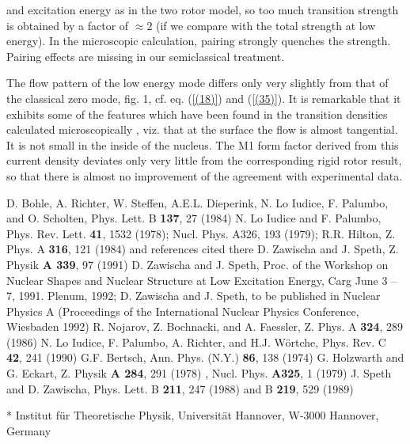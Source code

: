 \documentclass[fleqn,twocolumn,a4paper]{ikpar}
\begin{document}
and excitation energy as in the two rotor model, so
too much transition
strength is obtained by a factor of $\approx 2$ (if we compare with
the total strength at low energy). In the microscopic calculation,
pairing strongly quenches the strength.
Pairing effects are missing in
our semiclassical treatment.
\par
The flow pattern of the low energy
mode differs only very slightly from
that of the classical zero mode, fig. 1, cf. eq. (\ref{(18)}) and (\ref{(35)}).
It is remarkable that it exhibits some of the features
which have been found in the transition densities calculated
microscopically \cite{r14,r13},
viz. that at the surface the flow is almost tangential.
It is not small in the inside of the nucleus.
The M1 form factor derived
from this current density deviates only
very little from the corresponding rigid rotor result, so that
there is almost no improvement of the agreement with experimental
data.
\par
\par\bigskip

\begin{thebibliography}{99}
 D. Bohle, A. Richter, W. Steffen, A.E.L. Dieperink, N. Lo Iudice,
F. Palumbo, and O. Scholten, Phys. Lett. B {\bf 137}, 27 (1984)
 N. Lo Iudice and F. Palumbo, Phys. Rev. Lett. {\bf 41}, 1532 (1978);
 Nucl. Phys. A326, 193 (1979);
 R.R. Hilton,
Z. Phys. A {\bf 316}, 121 (1984) and references cited there
 D. Zawischa and J. Speth, Z. Physik {\bf A 339}, 97 (1991)
 D. Zawischa and J. Speth, Proc. of the Workshop on Nuclear
Shapes and Nuclear Structure at Low Excitation Energy, Carg
June 3 -- 7, 1991. Plenum, 1992;
 D. Zawischa and J. Speth,
to be published in Nuclear Physics A (Proceedings of the International
Nuclear Physics Conference, Wiesbaden 1992)
 R. Nojarov, Z. Bochnacki, and A. Faessler,
 Z. Phys. A {\bf 324}, 289 (1986)
 N. Lo Iudice, F. Palumbo, A. Richter, and H.J. W\"ortche,
Phys. Rev. C {\bf 42}, 241 (1990)
 G.F. Bertsch, Ann. Phys. (N.Y.) {\bf 86}, 138 (1974)
 G. Holzwarth and G. Eckart, Z. Physik {\bf A 284}, 291 (1978)%
, Nucl. Phys. {\bf A325}, 1 (1979)
 J. Speth  and D. Zawischa, Phys. Lett. B {\bf 211}, 247 (1988)
and B {\bf 219}, 529 (1989)
\end{thebibliography}
\medskip
* Institut f\"ur Theoretische Physik,
Universit\"at Hannover,
W-3000 Hannover, Germany\par
\vfill
\end{document}
